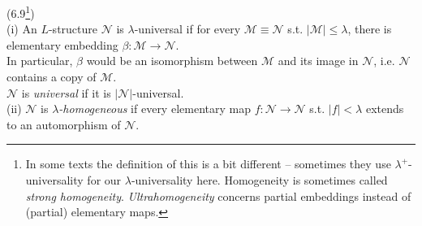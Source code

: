 \documentclass[a4paper]{article}
\begin{document}
\begin{defi} (6.9\footnote{In some texts the definition of this is a bit different -- sometimes they use $\lambda^+$-universality for our $\lambda$-universality here. Homogeneity is sometimes called \emph{strong homogeneity}. \emph{Ultrahomogeneity} concerns partial embeddings instead of (partial) elementary maps.})\\
    (i) An $L$-structure $\mathcal{N}$ is $\lambda$-universal if for every $\mathcal{M} \equiv \mathcal{N}$ s.t. $|\mathcal{M}| \leq \lambda$, there is elementary embedding $\beta:\mathcal{M} \to \mathcal{N}$.\\
    In particular, $\beta$ would be an isomorphism between $\mathcal{M}$ and its image in $\mathcal{N}$, i.e. $\mathcal{N}$ contains a copy of $\mathcal{M}$.\\
    $\mathcal{N}$ is \emph{universal} if it is $|\mathcal{N}|$-universal.\\
    (ii) $\mathcal{N}$ is \emph{$\lambda$-homogeneous} if every elementary map $f:\mathcal{N} \to \mathcal{N}$ s.t. $|f|<\lambda$ extends to an automorphism of $\mathcal{N}$.
\end{defi}
\end{document}
